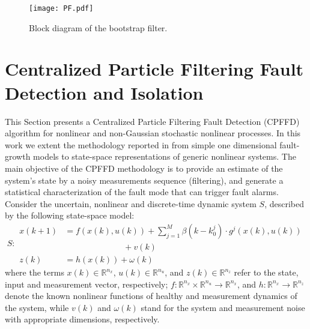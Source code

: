 \documentclass[10pt,twocolumn,twoside]{IEEEtran}
\begin{document}
\begin{figure}
\centering{}\texttt{[image: PF.pdf]}\caption{Block diagram of the bootstrap filter. \label{fig:Schematic-of-PF} }
\end{figure}

\section{Centralized Particle Filtering Fault Detection and Isolation}\label{sec:Centralized-Particle-Filtering-1}

This Section presents a Centralized Particle Filtering Fault Detection
(CPFFD) algorithm for nonlinear and non-Gaussian stochastic nonlinear
processes. In this work we extent the methodology reported in \cite{orchard2007particle}
from simple one dimensional fault-growth models to state-space representations
of generic nonlinear systems. The main objective of the CPFFD methodology
is to provide an estimate of the system's state by a noisy measurements
sequence (filtering), and generate a statistical characterization
of the fault mode that can trigger fault alarms. Consider the uncertain,
nonlinear and discrete-time dynamic system $S$, described by the
following state-space model:
\begin{equation}
S:\begin{aligned}x\left(k+1\right) & =f(x(k),u(k))+\sum_{j=1}^{M}\beta(k-k_{0}^{j})\cdot g^{j}(x(k),u(k))\\
 & \qquad\qquad\qquad\quad+v(k)\\
z\left(k\right) & =h\left(x\left(k\right)\right)+\omega\left(k\right)
\end{aligned}
\label{eq:state space model}
\end{equation}
\noindent where the terms $x\left(k\right)\in\mathbb{R}^{n_{x}}$,
$u\left(k\right)\in\mathbb{R}^{n_{u}}$, and $z\left(k\right)\in\mathbb{R}^{n_{z}}$
refer to the state, input and measurement vector, respectively; $f:\mathbb{R}^{n_{x}}\times\mathbb{R}^{n_{u}}\rightarrow\mathbb{R}^{n_{x}}$,
and $h:\mathbb{R}^{n_{x}}\rightarrow\mathbb{R}^{n_{z}}$ denote the
known nonlinear functions of healthy and measurement dynamics of the
system, while $v\left(k\right)$ and $\omega\left(k\right)$ stand
for the system and measurement noise with appropriate dimensions,
respectively. 
\end{document}
